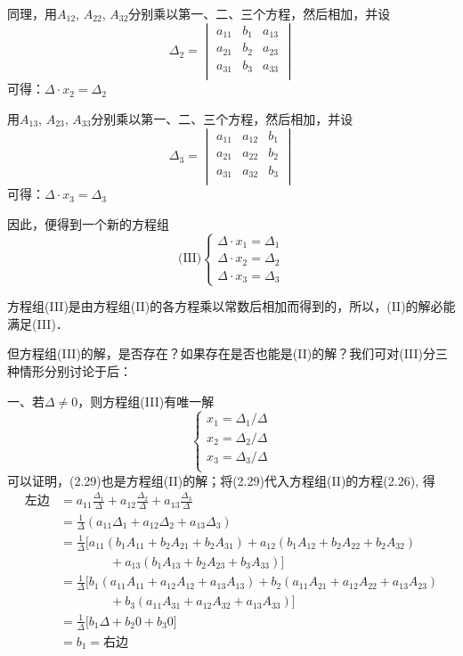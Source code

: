 同理，用$A_{12}$, $A_{22}$, $A_{32}$分别乘以第一、二、三个方程，然后相加，并设
\[\Delta_2=\begin{vmatrix}
    a_{11}&b_1&a_{13}\\
    a_{21}&b_2&a_{23}\\
    a_{31}&b_3&a_{33}\\
\end{vmatrix}\]
可得：$\Delta\cdot  x_2=\Delta_2$

用$A_{13}$, $A_{23}$, $A_{33}$分别乘以第一、二、三个方程，然后相加，并设
\[\Delta_3=\begin{vmatrix}
    a_{11}&a_{12}&b_{1}\\
    a_{21}&a_{22}&b_{2}\\
    a_{31}&a_{32}&b_{3}\\
\end{vmatrix}\]
可得：$\Delta\cdot  x_3=\Delta_3$

因此，便得到一个新的方程组
\[\text{(III)}\begin{cases}
    \Delta\cdot  x_1=\Delta_1\\
    \Delta\cdot  x_2=\Delta_2\\
    \Delta\cdot  x_3=\Delta_3
\end{cases}\]

方程组(III)是由方程组(II)的各方程乘以常数后相加而得到的，所以，(II)的解必能满足(III)．

但方程组(III)的解，是否存在？如果存在是否也能是(II)的解？我们可对(III)分三种情形分别讨论于后：


一、若$\Delta \ne 0$，则方程组(III)有唯一解
\begin{equation}
    \begin{cases}
        x_1=\Delta_1/\Delta\\
        x_2=\Delta_2/\Delta\\
        x_3=\Delta_3/\Delta\\
    \end{cases}
\end{equation}
可以证明，(2.29)也是方程组(II)的解；将(2.29)代入方程组(II)的方程(2.26), 得
\begin{align*}
 \text{左边}&=a_{11}\frac{\Delta_1}{\Delta}+a_{12}\frac{\Delta_2}{\Delta}+a_{13}\frac{\Delta_3}{\Delta}\\   
&=\frac{1}{\Delta}\left(a_{11}\Delta_1+a_{12}\Delta_2+a_{13}\Delta_3\right)\\
&=\frac{1}{\Delta}\big[a_{11}(b_1A_{11}+b_2A_{21}+b_2A_{31})+a_{12}(b_1A_{12}+b_2A_{22}+b_2A_{32})\\
&\qquad \qquad +a_{13}(b_1A_{13}+b_2A_{23}+b_3A_{33})\big]\\
&=\frac{1}{\Delta}\big[b_{1}(a_{11}A_{11}+a_{12}A_{12}+a_{13}A_{13})+b_{2}(a_{11}A_{21}+a_{12}A_{22}+a_{13}A_{23})\\
&\qquad \qquad +b_{3}(a_{11}A_{31}+a_{12}A_{32}+a_{13}A_{33})\big]\\
&=\frac{1}{\Delta}\big[b_1\Delta +b_2 0 +b_3 0\big]\tag{定理10, 11}\\
&=b_1=\text{右边}
\end{align*}


